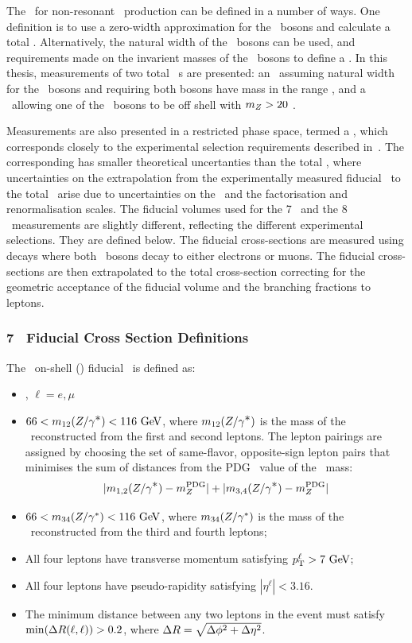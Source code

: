 The \cx\ for non-resonant \ZZ\ production can be defined in a number of
ways. One definition is to use a zero-width approximation for the \Z\ bosons and
calculate a total \cx. Alternatively, the natural width of the \Z\
bosons can be used, and requirements made on the invarient masses of the \Z\
bosons to define a \cx. In this thesis, measurements of two total \ZZ\ \cx s
are presented: an \intro{on-shell} \cx\, assuming natural width for the
\Z\ bosons and requiring both bosons have mass in the range \sstooosZ, and a
\cx\ allowing one of the \Z\ bosons to be off shell with $m_{Z}>20$
\gev.

Measurements are also presented in a restricted phase space, termed a
, which corresponds closely to the experimental selection
requirements described in~\chap{ObjEventSelection}. The corresponding
\intro{fiducial \cx} has smaller theoretical uncertanties than the total \cx,
where uncertainties on the extrapolation from the experimentally measured
fiducial \cx\ to the total \cx\ arise due to uncertainties on the \partDF\ and
the factorisation and renormalisation scales. The fiducial volumes used for the
7 \tev\ and the 8 \tev\ measurements are slightly different, reflecting the
different experimental selections. They are defined below. The fiducial
cross-sections are measured using decays where both \Z\ bosons decay to either electrons
or muons. The fiducial
cross-sections are then extrapolated to the total cross-section correcting for
the geometric acceptance of the fiducial volume and the branching
fractions to leptons.

\subsubsection{7 \tev\ Fiducial Cross Section Definitions}

The \zzllll\ on-shell (\ZZ) fiducial \cx\ is defined as:

\begin{itemize}
\item{\ZorgZorglplmlplm, $\ell = e,\mu$}
\item{ $66 < m_{12}(\Zorgv) <  116\GeV$, where $m_{12}(Z/\gamma^{\textstyle *})$ is
the mass of the \Z\ reconstructed from the first and second leptons.  The
lepton pairings are assigned by choosing the set of 
same-flavor, opposite-sign lepton pairs that minimises the sum of distances from
the PDG~\cite{PDG} value of the \Z\ mass:
\begin{equation}
|m_{1,2}(Z/\gamma^{\textstyle *}) - m_{Z}^{\rm PDG}| + |m_{3,4}(Z/\gamma^{\textstyle *}) - m_{Z}^{\rm PDG}|
\end{equation}
}
\item{ $66 < m_{34}(\Z/\gamma^*) <  116\GeV$, where $m_{34}(Z/\gamma^*)$ is
the mass of the \Z\ reconstructed from the third and fourth leptons;}
\item All four leptons have transverse momentum satisfying $\pT^{\ell} > 7\GeV$;
\item All four leptons have pseudo-rapidity satisfying $|\eta^{\ell}| < 3.16$.
\item{ The minimum distance between any two leptons in the event must satisfy
$\mathrm{min}(\Delta R(\ell,\ell)) > 0.2$, where $\Delta R = \sqrt{\Delta \phi^{2} +
\Delta \eta^{2}}$.}
\end{itemize}

